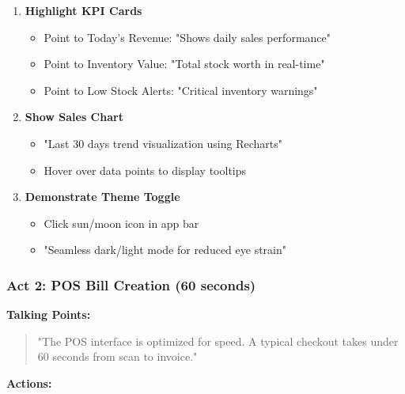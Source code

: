 \begin{enumerate}
    \item \textbf{Highlight KPI Cards}
    \begin{itemize}
        \item Point to Today's Revenue: "Shows daily sales performance"
        \item Point to Inventory Value: "Total stock worth in real-time"
        \item Point to Low Stock Alerts: "Critical inventory warnings"
    \end{itemize}
    
    \item \textbf{Show Sales Chart}
    \begin{itemize}
        \item "Last 30 days trend visualization using Recharts"
        \item Hover over data points to display tooltips
    \end{itemize}
    
    \item \textbf{Demonstrate Theme Toggle}
    \begin{itemize}
        \item Click sun/moon icon in app bar
        \item "Seamless dark/light mode for reduced eye strain"
    \end{itemize}
\end{enumerate}

\subsubsection{Act 2: POS Bill Creation (60 seconds)}

\textbf{Talking Points:}

\begin{quote}
"The POS interface is optimized for speed. A typical checkout takes under 60 seconds from scan to invoice."
\end{quote}

\textbf{Actions:}

